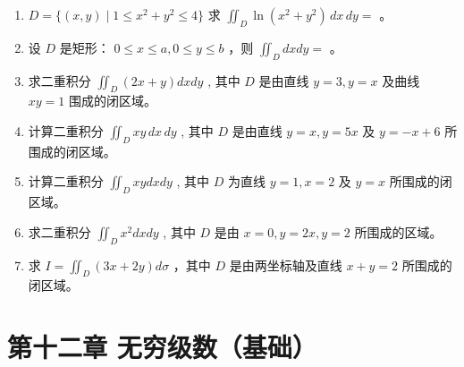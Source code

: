\documentclass[12pt, a4paper]{article}
\begin{document}
\begin{enumerate}
    \item $ D = \{(x, y) \mid 1 \leq x^{2} + y^{2} \leq 4\} $ 求 $ \iint_{D} \ln(x^{2} + y^{2}) \, dx \, dy = $ \underline{\hspace{2cm}}。

    \item 设 $D$ 是矩形： $ 0 \leq x \leq a, 0 \leq y \leq b $ ，则 $ \iint_{D} dxdy = $ \underline{\hspace{2cm}}。

    \item 求二重积分 $ \iint_{D}(2x+y)dxdy $ , 其中 $D$ 是由直线 $y=3, y=x$ 及曲线 $xy=1$ 围成的闭区域。

    \item 计算二重积分 $ \iint_{D} xy \, dx \, dy $ , 其中 $D$ 是由直线 $ y = x, y = 5x $ 及 $ y = -x + 6 $ 所围成的闭区域。

    \item 计算二重积分 $ \iint_{D} xydxdy $ , 其中 $D$ 为直线 $ y = 1, x = 2 $ 及 $ y = x $ 所围成的闭区域。

    \item 求二重积分 $ \iint_{D} x^{2} dx dy $ , 其中 $D$ 是由 $ x = 0, y = 2x, y = 2 $ 所围成的区域。

    \item 求 $ I = \iint_{D} (3x + 2y) d\sigma $ ，其中 $D$ 是由两坐标轴及直线 $ x + y = 2 $ 所围成的闭区域。
\end{enumerate}

\section*{第十二章 无穷级数（基础）}
\end{document}

